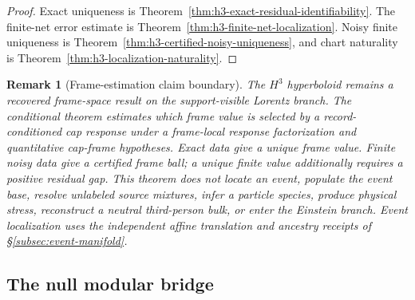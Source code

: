 \documentclass[11pt]{article}
\newtheorem{remark}[theorem]{Remark}
\begin{document}
\begin{proof}
Exact uniqueness is Theorem~\ref{thm:h3-exact-residual-identifiability}. The
finite-net error estimate is Theorem~\ref{thm:h3-finite-net-localization}.
Noisy finite uniqueness is Theorem~\ref{thm:h3-certified-noisy-uniqueness}, and
chart naturality is Theorem~\ref{thm:h3-localization-naturality}.
\end{proof}

\begin{remark}[Frame-estimation claim boundary]\label{rem:h3-localization-claim-boundary}
The \(H^3\) hyperboloid remains a recovered frame-space result on the support-visible
Lorentz branch. The conditional theorem estimates which frame value is selected by a
record-conditioned cap response under a frame-local response factorization and quantitative
cap-frame hypotheses. Exact data give a unique frame value. Finite noisy data give a certified
frame ball; a unique finite value additionally requires a positive residual gap. This theorem
does not locate an event, populate the event base, resolve unlabeled source mixtures, infer a
particle species, produce physical stress, reconstruct a neutral third-person bulk, or enter the
Einstein branch. Event localization uses the independent affine translation and ancestry receipts
of \S\ref{subsec:event-manifold}.
\end{remark}
\subsection{The null modular bridge}
\end{document}
